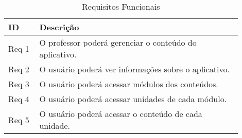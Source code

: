 \begin{table}[H]
\centering
\caption{Requisitos Funcionais}
\label{tab:requisitos_funcionais}

\begin{tabular}{|C{0.12\linewidth}|C{0.78\linewidth}|}
\hline
\bfseries ID    & \bfseries Descrição                                           \\ \hline
Req 1 & O professor poderá gerenciar o conteúdo do aplicativo. \\ \hline
Req 2 & O usuário poderá ver informações sobre o aplicativo.   \\ \hline
Req 3 & O usuário poderá acessar módulos dos conteúdos.        \\ \hline
Req 4 & O usuário poderá acessar unidades de cada módulo.      \\ \hline
Req 5 & O usuário poderá acessar o conteúdo de cada unidade.   \\ \hline
\end{tabular}
{}
\end{table}